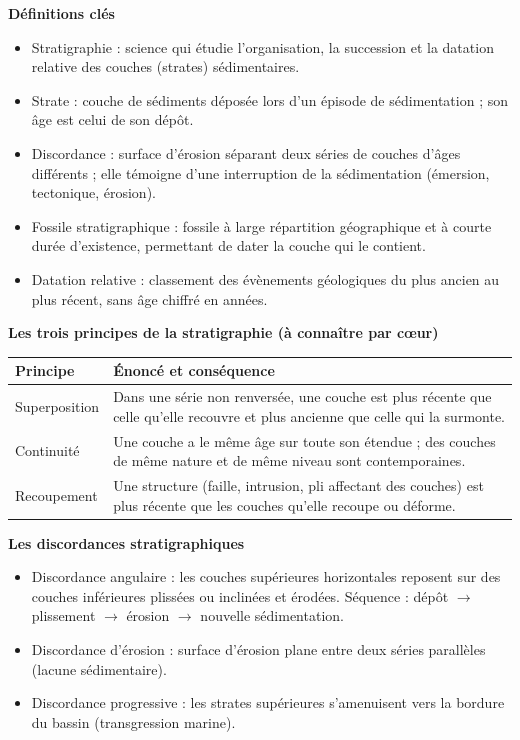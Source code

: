 \documentclass[11pt]{article}
\newcommand{\cle}[1]{{\popxbold\color{popdark}#1}}
\begin{document}
\begin{bilan}
\textbf{Définitions clés}
\begin{itemize}
  \item \cle{Stratigraphie} : science qui étudie l'organisation, la succession et la datation relative des couches (strates) sédimentaires.
  \item \cle{Strate} : couche de sédiments déposée lors d'un épisode de sédimentation ; son âge est celui de son dépôt.
  \item \cle{Discordance} : surface d'érosion séparant deux séries de couches d'âges différents ; elle témoigne d'une interruption de la sédimentation (émersion, tectonique, érosion).
  \item \cle{Fossile stratigraphique} : fossile à large répartition géographique et à courte durée d'existence, permettant de dater la couche qui le contient.
  \item \cle{Datation relative} : classement des évènements géologiques du plus ancien au plus récent, sans âge chiffré en années.
\end{itemize}

\textbf{Les trois principes de la stratigraphie (à connaître par c\oe ur)}
\begin{center}
\begin{tabularx}{\linewidth}{|l|X|}\hline
\rowcolor{popblueL} \textbf{Principe} & \textbf{Énoncé et conséquence} \\ \hline
Superposition & Dans une série non renversée, une couche est plus récente que celle qu'elle recouvre et plus ancienne que celle qui la surmonte. \\ \hline
Continuité & Une couche a le même âge sur toute son étendue ; des couches de même nature et de même niveau sont contemporaines. \\ \hline
Recoupement & Une structure (faille, intrusion, pli affectant des couches) est plus récente que les couches qu'elle recoupe ou déforme. \\ \hline
\end{tabularx}
\end{center}

\textbf{Les discordances stratigraphiques}
\begin{itemize}
  \item \cle{Discordance angulaire} : les couches supérieures horizontales reposent sur des couches inférieures plissées ou inclinées et érodées. Séquence : dépôt $\rightarrow$ plissement $\rightarrow$ érosion $\rightarrow$ nouvelle sédimentation.
  \item \cle{Discordance d'érosion} : surface d'érosion plane entre deux séries parallèles (lacune sédimentaire).
  \item \cle{Discordance progressive} : les strates supérieures s'amenuisent vers la bordure du bassin (transgression marine).
\end{itemize}


\end{bilan}
\end{document}
